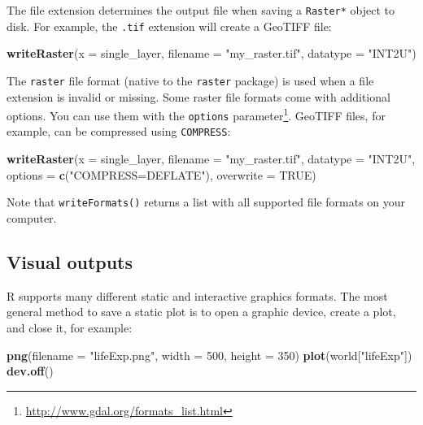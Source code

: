 \documentclass[]{krantz}
\newenvironment{Shaded}{\begin{snugshade}}{\end{snugshade}}
\newcommand{\DataTypeTok}[1]{\textcolor[rgb]{0.27,0.27,0.27}{#1}}
\newcommand{\DecValTok}[1]{\textcolor[rgb]{0.06,0.06,0.06}{#1}}
\newcommand{\KeywordTok}[1]{\textcolor[rgb]{0.27,0.27,0.27}{\textbf{#1}}}
\newcommand{\NormalTok}[1]{#1}
\newcommand{\OtherTok}[1]{\textcolor[rgb]{0.37,0.37,0.37}{#1}}
\newcommand{\StringTok}[1]{\textcolor[rgb]{0.5,0.5,0.5}{#1}}
\let\rmarkdownfootnote\footnote%
\def\footnote{\protect\rmarkdownfootnote}
\renewcommand{\href}[2]{#2\footnote{\url{#1}}}
\begin{document}
The file extension determines the output file when saving a \texttt{Raster*} object to disk.
For example, the \texttt{.tif} extension will create a GeoTIFF file:

\begin{Shaded}
\begin{Highlighting}[]
\KeywordTok{writeRaster}\NormalTok{(}\DataTypeTok{x =}\NormalTok{ single_layer,}
            \DataTypeTok{filename =} \StringTok{"my_raster.tif"}\NormalTok{,}
            \DataTypeTok{datatype =} \StringTok{"INT2U"}\NormalTok{)}
\end{Highlighting}
\end{Shaded}

The \texttt{raster} file format (native to the \texttt{raster} package) is used when a file extension is invalid or missing.
Some raster file formats come with additional options.
You can use them with the \texttt{options} \href{http://www.gdal.org/formats_list.html}{parameter}.
GeoTIFF files, for example, can be compressed using \texttt{COMPRESS}:

\begin{Shaded}
\begin{Highlighting}[]
\KeywordTok{writeRaster}\NormalTok{(}\DataTypeTok{x =}\NormalTok{ single_layer,}
            \DataTypeTok{filename =} \StringTok{"my_raster.tif"}\NormalTok{,}
            \DataTypeTok{datatype =} \StringTok{"INT2U"}\NormalTok{,}
            \DataTypeTok{options =} \KeywordTok{c}\NormalTok{(}\StringTok{"COMPRESS=DEFLATE"}\NormalTok{),}
            \DataTypeTok{overwrite =} \OtherTok{TRUE}\NormalTok{)}
\end{Highlighting}
\end{Shaded}

Note that \texttt{writeFormats()} returns a list with all supported file formats on your computer.

\hypertarget{visual-outputs}{%
\subsection{Visual outputs}\label{visual-outputs}}

R supports many different static and interactive graphics formats.
The most general method to save a static plot is to open a graphic device, create a plot, and close it, for example:

\begin{Shaded}
\begin{Highlighting}[]
\KeywordTok{png}\NormalTok{(}\DataTypeTok{filename =} \StringTok{"lifeExp.png"}\NormalTok{, }\DataTypeTok{width =} \DecValTok{500}\NormalTok{, }\DataTypeTok{height =} \DecValTok{350}\NormalTok{)}
\KeywordTok{plot}\NormalTok{(world[}\StringTok{"lifeExp"}\NormalTok{])}
\KeywordTok{dev.off}\NormalTok{()}
\end{Highlighting}
\end{Shaded}
\end{document}
